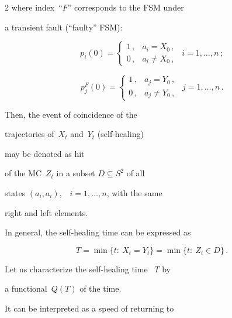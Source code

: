 \begin{multicols}{2}
where index~``$F$'' corresponds to the  FSM under

a transient fault (``faulty'' FSM):

$$

p_{i}(0)

=

\begin{cases}

1\,,      &a_i=X_0\,,   \\

0\,,      &a_i\ne X_0\,,

\end{cases}

\ \ i=1,\ldots ,n\,;

$$

$$

p^F_{j}(0)

=

\begin{cases}

1\,,      &a_j=Y_0\,,   \\

0\,,      &a_j\ne Y_0\,,

\end{cases}

\ \ j=1,\ldots ,n\,.

$$

Then,  the event of coincidence of the

trajectories of~$X_t$ and~$Y_t$ (self-healing)

may be denoted as hit

of the MC~$Z_t$ in a subset $D \subseteq S^2$ of all

states $(a_i,a_i)$,\ \ $i=1,\ldots,n$, with the same

right and left elements.



In general, the self-healing time  can be expressed as

\begin{equation}

T =

\min\{t:\ X_t=Y_t\}=\min\{t:\ Z_t\in D\}\,.

\label{e1fr}

\end{equation}

Let us characterize the self-healing time ~$T$ by

a functional~$Q(T)$ of the time.

It can be interpreted as a speed of returning to


\end{multicols}
